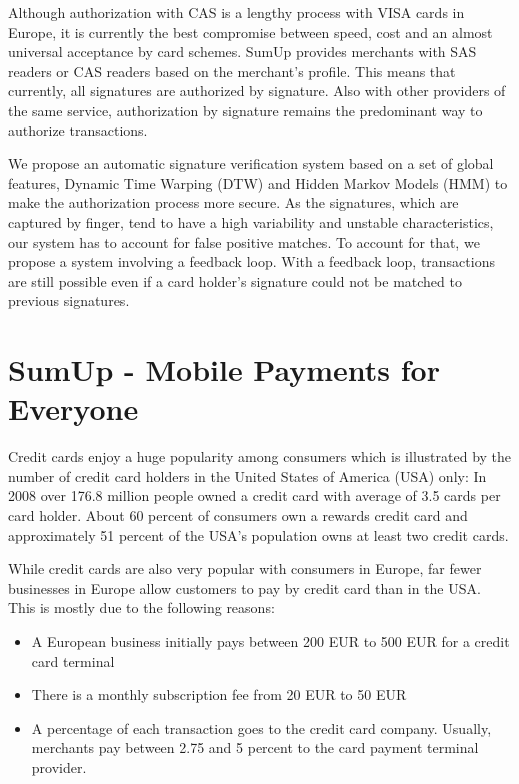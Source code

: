 \documentclass[a4paper, oneside]{csthesis}
\begin{document}
Although authorization with CAS is a lengthy process with VISA cards in Europe, it is currently the best compromise between speed, cost and an almost universal acceptance by card schemes. SumUp provides merchants with SAS readers or CAS readers based on the merchant's profile. This means that currently, all signatures are authorized by signature. Also with other providers of the same service, authorization by signature remains the predominant way to authorize transactions.

We propose an automatic signature verification system based on a set of global features, Dynamic Time Warping (DTW) and Hidden Markov Models (HMM) to make the authorization process more secure. As the signatures, which are captured by finger, tend to have a high variability and unstable characteristics, our system has to account for false positive matches. To account for that, we propose a system involving a feedback loop. With a feedback loop, transactions are still possible even if a card holder's signature could not be matched to previous signatures.





\section{SumUp - Mobile Payments for Everyone}
\label{intro-sumup}

Credit cards enjoy a huge popularity among consumers which is illustrated by the number of credit card holders in the United States of America (USA) only: In 2008 over 176.8 million people owned a credit card with average of 3.5 cards per card holder. About 60 percent of consumers own a rewards credit card and approximately 51 percent of the USA's population owns at least two credit cards.\cite{woolsey2010credit}

While credit cards are also very popular with consumers in Europe, far fewer businesses in Europe allow customers to pay by credit card than in the USA. This is mostly due to the following reasons:
\begin{itemize}
\item A European business initially pays between 200 EUR to 500 EUR for a credit card terminal
\item There is a monthly subscription fee from 20 EUR to 50 EUR
\item A percentage of each transaction goes to the credit card company. Usually, merchants pay between 2.75 and 5 percent to the card payment terminal provider.
\end{itemize}
\end{document}
